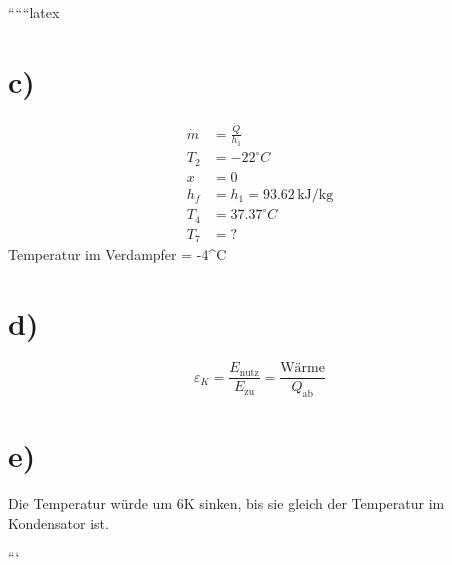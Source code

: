 ``````latex


\section*{c)}
\begin{align*}
    \dot{m} &= \frac{\dot{Q}}{h_1} \\
    T_2 &= -22^\circ C \\
    x &= 0 \\
    h_f &= h_1 = 93.62 \, \text{kJ/kg} \\
    T_4 &= 37.37^\circ C \\
    T_7 &= ?
\end{align*}
Temperatur im Verdampfer = -4^\circ C

\section*{d)}
\begin{equation*}
    \varepsilon_K = \frac{E_{\text{nutz}}}{E_{\text{zu}}} = \frac{\text{Wärme}}{Q_{\text{ab}}}
\end{equation*}

\section*{e)}
Die Temperatur würde um 6K sinken, bis sie gleich der Temperatur im Kondensator ist.

```